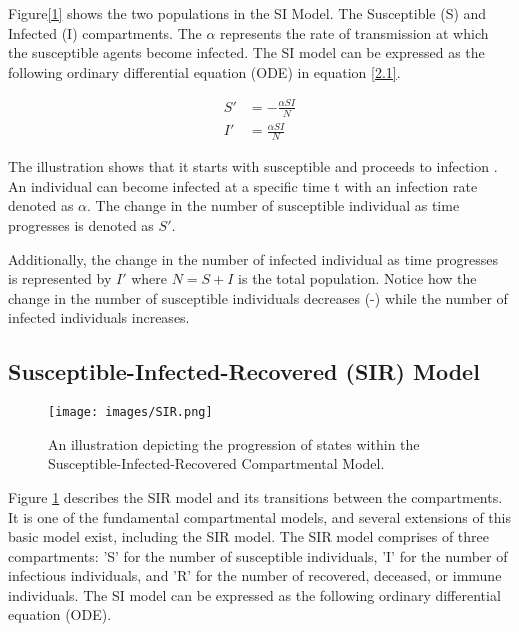  \hspace{1 cm}Figure\ref{1} shows the two populations in the SI Model. The Susceptible (S) and Infected (I) compartments. The $\alpha$ represents the rate of transmission at which the susceptible agents become infected. The SI model can be expressed as the following ordinary differential equation (ODE) in equation \ref{2.1}.

\begin{equation}
		\begin{split}
		S' &= -\frac{\alpha SI}{N}\\
		I' &= \frac{\alpha SI}{N}
		\label{2.1}
	\end{split}
\end{equation}




The illustration shows that it starts with susceptible and proceeds to infection . An individual can become infected at a specific time t with an infection rate denoted as $\alpha$. The change in the number of susceptible individual as time progresses is denoted as $S'$.  

Additionally, the change in the number  of infected individual as time progresses is represented by $I'$ where  $N = S + I$  is the total population.  Notice how the change in the number of susceptible individuals decreases (-) while the number of infected individuals increases. 

\subsection{ Susceptible-Infected-Recovered (SIR) Model}

\begin{figure}[H]
	\centering
{\texttt{[image: images/SIR.png]}}
\caption{An illustration depicting the progression of states within the Susceptible-Infected-Recovered Compartmental Model. }%
	\label{fig:2}
\end{figure}

Figure \ref{fig:2} describes the SIR model and its transitions between the compartments. It is one of the fundamental compartmental models, and several extensions of this basic model exist, including the SIR model. The SIR model comprises of three compartments: 'S' for the number of susceptible individuals, 'I' for the number of infectious individuals, and 'R' for the number of recovered, deceased, or immune individuals. The SI model can be expressed as the following ordinary differential equation (ODE). \cite{SIR}

